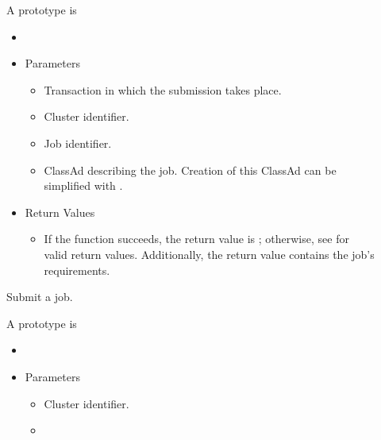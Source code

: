 \begin{description}
\item []
  A prototype is
  
  \begin{itemize}
    \item[] 
    \item[] Parameters
    \begin{itemize}
      \item[] 

      Transaction in which the submission takes place.
      \item[]  

      Cluster identifier.
      \item[] 

      Job identifier.
      \item[]  

      ClassAd describing the job. Creation of this ClassAd can be simplified
      with .
    \end{itemize}
    \item[] Return Values
    \begin{itemize}
      \item[] If the function succeeds, the return value is ; 
      otherwise, see  for valid return values. Additionally,
      the return value contains the job's requirements.
    \end{itemize}
  \end{itemize}  

  Submit a job.
\item []
  A prototype is 

  \begin{itemize}
    \item[] 
    \item[] Parameters
    \begin{itemize}
      \item[]  

      Cluster identifier.
      \item[] 


\end{itemize}
\end{itemize}
\end{description}
